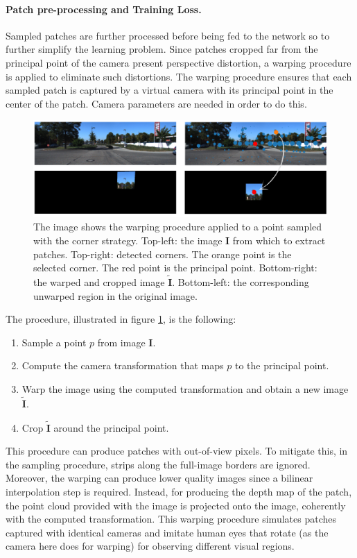 \paragraph{Patch pre-processing and Training Loss.}
Sampled patches are further processed before being fed to the network so to further simplify the learning problem.
Since patches cropped far from the principal point of the camera present perspective distortion, a warping procedure is applied to eliminate such distortions.
The warping procedure ensures that each sampled patch is captured by a virtual camera with its principal point in the center of the patch.
Camera parameters are needed in order to do this.
\begin{figure}
    \begin{adjustwidth}{-0.2\textwidth}{-0.2\textwidth}
    \centering
    \includegraphics[scale=0.4]{figs/warping}
    \end{adjustwidth}
    \caption{
        The image shows the warping procedure applied to a point sampled with the corner strategy.
        Top-left: the image $\mathbf{I}$ from which to extract patches.
        Top-right: detected corners. The orange point is the selected corner. The red point is the principal point.
        Bottom-right: the warped and cropped image $\tilde{\mathbf{I}}$.
        Bottom-left: the corresponding unwarped region in the original image.
        \label{fig:warping}
    }
\end{figure}
The procedure, illustrated in figure \ref{fig:warping}, is the following:
\begin{enumerate}
    \item{Sample a point $p$ from image $\mathbf{I}$.}
    \item{Compute the camera transformation that maps $p$ to the principal point.}
    \item{Warp the image using the computed transformation and obtain a new image $\tilde{\mathbf{I}}$.}
    \item{Crop $\tilde{\mathbf{I}}$ around the principal point.}
\end{enumerate}
This procedure can produce patches with out-of-view pixels.
To mitigate this, in the sampling procedure, strips along the full-image borders are ignored.
Moreover, the warping can produce lower quality images since a bilinear interpolation step is required.
Instead, for producing the depth map of the patch, the point cloud provided with the image is projected onto the image, coherently with the computed transformation.
This warping procedure simulates patches captured with identical cameras and imitate human eyes that rotate (as the camera here does for warping) for observing different visual regions.

